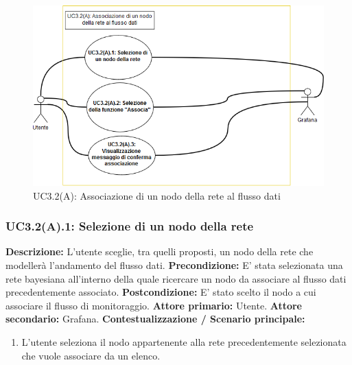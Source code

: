                     \begin{figure}[!htbp]
                    	\centering
                    	\includegraphics[width=\textwidth]{UC3-2(A).png}
                    	\caption{UC3.2(A): Associazione di un nodo della rete al flusso dati}
                    	\label{uc3.2a}
                    \end{figure}
                    
                \subsubsection{UC3.2(A).1: Selezione di un nodo della rete}
                    \textbf{Descrizione:} L’utente sceglie, tra quelli proposti, un nodo della rete che modellerà l'andamento del flusso dati.
                    \newline
                    \textbf{Precondizione:} E' stata selezionata una rete bayesiana all'interno della quale ricercare un nodo da associare al flusso dati precedentemente associato.
                    \newline
                    \textbf{Postcondizione:} E' stato scelto il nodo a cui associare il flusso di monitoraggio.
                    \newline
                    \textbf{Attore primario:} Utente.
                    \newline
                    \textbf{Attore secondario:} Grafana.
                    \newline
                    \textbf{Contestualizzazione / Scenario principale:} \begin{enumerate}
                        \item L’utente seleziona il nodo appartenente alla rete precedentemente selezionata che vuole associare da un elenco.
                    \end{enumerate}
                    
